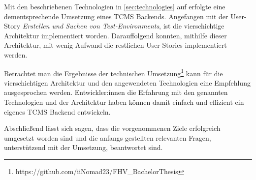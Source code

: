 \documentclass[a4paper, fontsize=11pt, parskip=half, twoside]{scrreprt}
\begin{document}
	Mit den beschriebenen Technologien in \autoref{sec:technologies} auf  erfolgte eine dementsprechende Umsetzung eines \ac{TCMS} Backends.
	Angefangen mit der User-Story \emph{Erstellen und Suchen von Test-Environments}, ist die vierschichtige Architektur implementiert worden.
	Darauffolgend konnten, mithilfe dieser Architektur, mit wenig Aufwand die restlichen User-Stories implementiert werden.
	
	Betrachtet man die Ergebnisse der technischen Umsetzung\footnote{https://github.com/iiNomad23/FHV\_BachelorThesis} kann für die vierschichtigen Architektur und den angewendeten Technologien eine Empfehlung ausgesprochen werden. 
	Entwickler:innen die Erfahrung mit den genannten Technologien und der Architektur haben können damit einfach und effizient ein eigenes \ac{TCMS} Backend entwickeln.
	
	Abschließend lässt sich sagen, dass die vorgenommenen Ziele erfolgreich umgesetzt worden sind und die anfangs gestellten relevanten Fragen, unterstützend mit der Umsetzung, beantwortet sind.
	
	
	\clearpage
	\printbibliography
	
\end{document}
